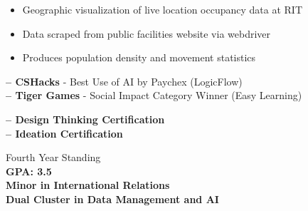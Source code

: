 \documentclass[10pt,a4paper,ragged2e,withhyper]{altacv}
\begin{document}
\begin{paracol}{2}
\divider

\begin{itemize}
    \item Geographic visualization of live location occupancy data at RIT
    \item Data scraped from public facilities website via webdriver
    \item Produces population density and movement statistics
\end{itemize}



\textbf{ -- CSHacks} - Best Use of AI by Paychex (LogicFlow)\\
\textbf{ -- Tiger Games} - Social Impact Category Winner (Easy Learning)\\

\divider

\textbf{ -- Design Thinking Certification}\\
\textbf{ -- Ideation Certification}

\medskip

\switchcolumn


Fourth Year Standing\\
\textbf{GPA: 3.5}\\
\textbf{Minor in International Relations}\\
\textbf{Dual Cluster in Data Management and AI}\\

\medskip


\par\smallskip
{}
\medskip
\divider

\par\smallskip
{}
\par\smallskip
{}
\par
{}
\par



\end{paracol}
\end{document}
